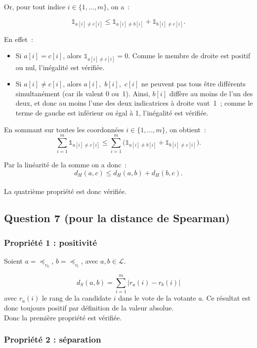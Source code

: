 \documentclass[11pt]{article}
\begin{document}
Or, pour tout indice $i \in \{1,\ldots,m\}$, on a~:

\[
\mathbb{1}_{a[i] \neq c[i]}
\le 
\mathbb{1}_{a[i] \neq b[i]} + \mathbb{1}_{b[i] \neq c[i]}.
\]

En effet :

\begin{itemize}
  \item Si $a[i] = c[i]$, alors $\mathbb{1}_{a[i] \neq c[i]} = 0$. Comme le membre de droite est positif ou nul, l'inégalité est vérifiée.
  \item Si $a[i] \neq c[i]$, alors $a[i]$, $b[i]$, $c[i]$ ne peuvent pas tous être différents simultanément (car ils valent 0 ou 1).  
  Ainsi, $b[i]$ diffère au moins de l’un des deux, et donc au moins l’une des deux indicatrices à droite vaut 1 ; comme le terme de gauche est inférieur ou égal à 1, l'inégalité est vérifiée.
\end{itemize}


En sommant sur toutes les coordonnées $i \in \{1,\ldots,m\}$, on obtient :
\[
\sum_{i=1}^m \mathbb{1}_{a[i] \neq c[i]} 
\le
\sum_{i=1}^m 
\big(
\mathbb{1}_{a[i] \neq b[i]} + \mathbb{1}_{b[i] \neq c[i]}
\big).
\]

Par la linéarité de la somme on a donc :
\[
d_H(a,c) \le d_H(a,b) + d_H(b,c).
\]
\\

La quatrième propriété est donc vérifiée.


\subsection{Question 7 (pour la distance de Spearman)}

\subsubsection{Propriété 1 : positivité}

Soient $a = \preceq_{v_k}$, $b = \preceq_{v_l}$, avec $a,b \in \mathcal{L}$.

\[
d_S(a,b) = \sum_{i=1}^m |r_a(i) - r_b(i)|
\]
avec $r_a(i)$ le rang de la candidate $i$ dans le vote de la votante $a$.  
Ce résultat est donc toujours positif par définition de la valeur absolue.
\\

Donc la première propriété est vérifiée.


\subsubsection{Propriété 2 : séparation}
\end{document}
